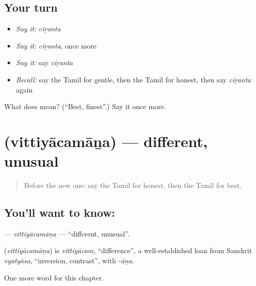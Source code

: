 \subsection*{Your turn}
\begin{itemize}
\raggedright
  \item \emph{Say it:} \emph{ciṟanta}
  \item \emph{Say it:} \emph{ciṟanta}, once more
  \item \emph{Say it:} say \emph{ciṟanta}
  \item \emph{Recall:} say the Tamil for gentle, then the Tamil for honest, then say \emph{ciṟanta} again
\end{itemize}

\begin{tcolorbox}[breakable,colback=teal!4,colframe=teal!35!black,title={Before you move on}]
What does  mean? (\textquotedblleft{}Best, finest\textquotedblright{}.) Say it once more.
\end{tcolorbox}
\section[\texorpdfstring{\ta{வித்தியாசமான} (vittiyācamāṉa)}{வித்தியாசமான (vittiyācamāṉa)}]{ (vittiyācamāṉa) — different, unusual}

\label{lesson:TA-C269-vittiyacamana}



\begin{quote}
Before the new one: say the Tamil for honest, then the Tamil for best.
\end{quote}

\subsection*{You'll want to know: }
\textbf{} — \emph{vittiyācamāṉa} — \textquotedblleft{}different, unusual\textquotedblright{}.

\begin{cousinweb}
\textbf{} (\emph{vittiyācamāṉa}) is \emph{vittiyācam}, \textquotedblleft{}difference\textquotedblright{}, a well-established loan from Sanskrit \emph{vyatyāsa}, \textquotedblleft{}inversion, contrast\textquotedblright{}, with \emph{-āṉa}.
\end{cousinweb}

\begin{grammarlens}[title={What you've built}]
One more word for this chapter.
\end{grammarlens}

